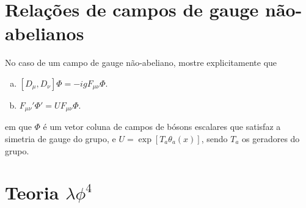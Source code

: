 \documentclass[a4paper, 11pt, oneside]{impression}
\begin{document}


\newpage

\chapter{Relações de campos de gauge não-abelianos}\label{quest: three}

\begin{exercise}{}
    No caso de um campo de gauge não-abeliano, mostre explicitamente que
    \begin{enumerate}[(a)]
        \item $[D_{\mu}, D_{\nu}]\Phi = -igF_{\mu\nu}\Phi$.
        \item $F_{\mu\nu}' \Phi' = UF_{\mu\nu}\Phi$.
    \end{enumerate}
    em que $\Phi$ é um vetor coluna de campos de bósons escalares que satisfaz a simetria de gauge do grupo, e $U = \exp[T_{a}\theta_{a}(x)]$, sendo $T_{a}$ os geradores do grupo.
\end{exercise}



\newpage

\chapter{Teoria \texorpdfstring{$\lambda\phi^{4}$}{}}\label{quest: four}
\end{document}

